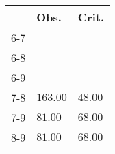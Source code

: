 \begin{table}[ht]
\centering
\begin{tabular}{rll}
  \hline
 & Obs. & Crit. \\ 
  \hline
6-7 &  &  \\ 
  6-8 &  &  \\ 
  6-9 &  &  \\ 
  7-8 & \(\mathbf{163.00}\) & \(\mathbf{48.00}\) \\ 
  7-9 & \(\mathbf{81.00}\) & \(\mathbf{68.00}\) \\ 
  8-9 & \(\mathbf{81.00}\) & \(\mathbf{68.00}\) \\ 
   \hline
\end{tabular}
\end{table}
